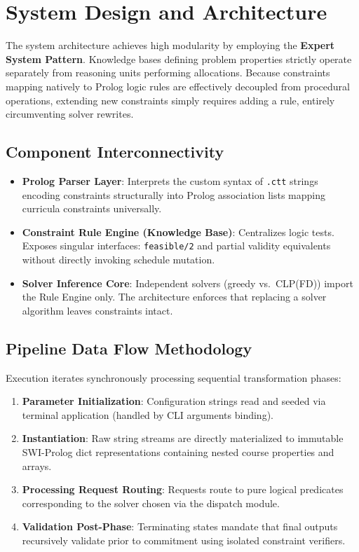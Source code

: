 \documentclass[11pt,letterpaper]{article}
\begin{document}
\section{System Design and Architecture}
The system architecture achieves high modularity by employing the \textbf{Expert System Pattern}. Knowledge bases defining problem properties strictly operate separately from reasoning units performing allocations. Because constraints mapping natively to Prolog logic rules are effectively decoupled from procedural operations, extending new constraints simply requires adding a rule, entirely circumventing solver rewrites.

\subsection{Component Interconnectivity}
\begin{itemize}[nosep]
  \item \textbf{Prolog Parser Layer}: Interprets the custom syntax of \texttt{.ctt} strings encoding constraints structurally into Prolog association lists mapping curricula constraints universally.
  \item \textbf{Constraint Rule Engine (Knowledge Base)}: Centralizes logic tests. Exposes singular interfaces: \texttt{feasible/2} and partial validity equivalents without directly invoking schedule mutation.
  \item \textbf{Solver Inference Core}: Independent solvers (greedy vs.\ CLP(FD)) import the Rule Engine only. The architecture enforces that replacing a solver algorithm leaves constraints intact.
\end{itemize}

\subsection{Pipeline Data Flow Methodology}
Execution iterates synchronously processing sequential transformation phases:
\begin{enumerate}
    \item \textbf{Parameter Initialization}: Configuration strings read and seeded via terminal application (handled by CLI arguments binding).
    \item \textbf{Instantiation}: Raw string streams are directly materialized to immutable SWI-Prolog dict representations containing nested course properties and arrays.
    \item \textbf{Processing Request Routing}: Requests route to pure logical predicates corresponding to the solver chosen via the dispatch module.
    \item \textbf{Validation Post-Phase}: Terminating states mandate that final outputs recursively validate prior to commitment using isolated constraint verifiers.
\end{enumerate}
\end{document}
